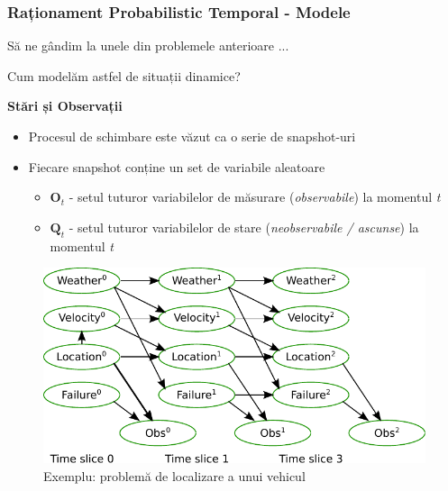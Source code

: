 \begin{frame}[t]
  \frametitle{Raționament Probabilistic Temporal - Modele}
	
	Să ne gândim la unele din problemele anterioare ...	
	\vspace*{0.5em}
	\pause	
	
	Cum modelăm astfel de situații dinamice? 
	\vspace*{0.5em}
	\pause	
	
	\textbf{Stări și Observații}
	\begin{itemize}
		\item Procesul de schimbare este văzut ca o serie de \alert{snapshot-uri}
		\item Fiecare snapshot conține un set de variabile aleatoare
    	\begin{itemize}
			\item $\mathbf{O}_t$ - setul tuturor variabilelor de măsurare (\alert{\emph{observabile}}) la momentul \emph{t}
			\item $\mathbf{Q}_t$ - setul tuturor variabilelor de stare (\alert{\emph{neobservabile / ascunse}}) la momentul \emph{t}	    	
		\end{itemize}
	\end{itemize}
	
	\begin{figure}
		\centering
		\includegraphics[height=0.3\textheight]{graphics/hmm-intro/dbn-vehicle/unrolled.pdf} 
  		\caption{\tiny{Exemplu: problemă de localizare a unui vehicul \citep{KollerFriedman09}}}
  		\label{fig:unrolled-states-observations}
  	\end{figure}
\end{frame}

